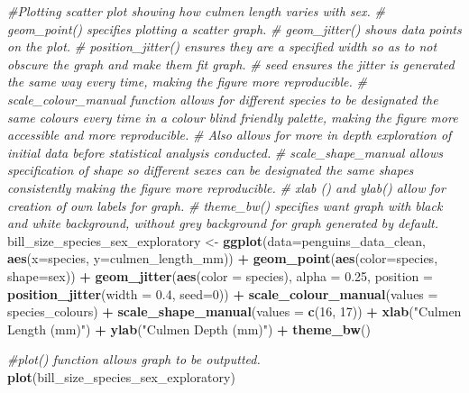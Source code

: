 \documentclass[
]{article}
\newenvironment{Shaded}{\begin{snugshade}}{\end{snugshade}}
\newcommand{\AttributeTok}[1]{\textcolor[rgb]{0.13,0.29,0.53}{#1}}
\newcommand{\CommentTok}[1]{\textcolor[rgb]{0.56,0.35,0.01}{\textit{#1}}}
\newcommand{\DecValTok}[1]{\textcolor[rgb]{0.00,0.00,0.81}{#1}}
\newcommand{\FloatTok}[1]{\textcolor[rgb]{0.00,0.00,0.81}{#1}}
\newcommand{\FunctionTok}[1]{\textcolor[rgb]{0.13,0.29,0.53}{\textbf{#1}}}
\newcommand{\NormalTok}[1]{#1}
\newcommand{\OtherTok}[1]{\textcolor[rgb]{0.56,0.35,0.01}{#1}}
\newcommand{\SpecialCharTok}[1]{\textcolor[rgb]{0.81,0.36,0.00}{\textbf{#1}}}
\newcommand{\StringTok}[1]{\textcolor[rgb]{0.31,0.60,0.02}{#1}}
\begin{document}
\begin{Shaded}
\begin{Highlighting}[]
\CommentTok{\#Plotting scatter plot showing how culmen length varies with sex.}
\CommentTok{\#  geom\_point() specifies plotting a scatter graph.}
\CommentTok{\#  geom\_jitter() shows data points on the plot. }
\CommentTok{\#   position\_jitter() ensures they are a specified width so as to not obscure the graph and make them fit graph.}
\CommentTok{\#  seed ensures the jitter is generated the same way every time, making the figure more reproducible.}
\CommentTok{\#  scale\_colour\_manual function allows for different species to be designated the same colours every time in a colour blind friendly palette, making the figure more accessible and more reproducible. }
\CommentTok{\#     Also allows for more in depth exploration of initial data before statistical analysis conducted.}
\CommentTok{\#  scale\_shape\_manual allows specification of shape so different sexes can be designated the same shapes consistently making the figure more reproducible. }
\CommentTok{\#  xlab () and ylab() allow for creation of own labels for graph.}
\CommentTok{\#  theme\_bw() specifies want graph with black and white background, without grey background for graph generated by default.}
\NormalTok{bill\_size\_species\_sex\_exploratory }\OtherTok{\textless{}{-}} \FunctionTok{ggplot}\NormalTok{(}\AttributeTok{data=}\NormalTok{penguins\_data\_clean, }
                         \FunctionTok{aes}\NormalTok{(}\AttributeTok{x=}\NormalTok{species, }
                            \AttributeTok{y=}\NormalTok{culmen\_length\_mm)) }\SpecialCharTok{+} 
                         \FunctionTok{geom\_point}\NormalTok{(}\FunctionTok{aes}\NormalTok{(}\AttributeTok{color=}\NormalTok{species, }\AttributeTok{shape=}\NormalTok{sex)) }\SpecialCharTok{+} 
                         \FunctionTok{geom\_jitter}\NormalTok{(}\FunctionTok{aes}\NormalTok{(}\AttributeTok{color =}\NormalTok{ species), }\AttributeTok{alpha =} \FloatTok{0.25}\NormalTok{, }\AttributeTok{position =}                                                             \FunctionTok{position\_jitter}\NormalTok{(}\AttributeTok{width =} \FloatTok{0.4}\NormalTok{, }\AttributeTok{seed=}\DecValTok{0}\NormalTok{)) }\SpecialCharTok{+}
                         \FunctionTok{scale\_colour\_manual}\NormalTok{(}\AttributeTok{values =}\NormalTok{ species\_colours) }\SpecialCharTok{+} 
                         \FunctionTok{scale\_shape\_manual}\NormalTok{(}\AttributeTok{values =} \FunctionTok{c}\NormalTok{(}\DecValTok{16}\NormalTok{, }\DecValTok{17}\NormalTok{)) }\SpecialCharTok{+}
                         \FunctionTok{xlab}\NormalTok{(}\StringTok{"Culmen Length (mm)"}\NormalTok{) }\SpecialCharTok{+} 
                         \FunctionTok{ylab}\NormalTok{(}\StringTok{"Culmen Depth (mm)"}\NormalTok{) }\SpecialCharTok{+}
                         \FunctionTok{theme\_bw}\NormalTok{()}

\CommentTok{\#plot() function allows graph to be outputted.}
\FunctionTok{plot}\NormalTok{(bill\_size\_species\_sex\_exploratory)}
\end{Highlighting}
\end{Shaded}
\end{document}
